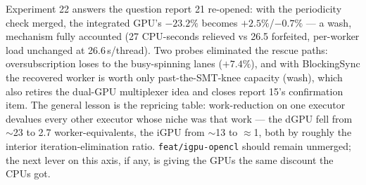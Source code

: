 \documentclass[
	english,
	letterpaper, oneside
]{article}
\begin{document}
Experiment 22 answers the question report 21 re-opened: with the periodicity
check merged, the integrated GPU's $-23.2\%$ becomes $+2.5\%$/$-0.7\%$ --- a
wash, mechanism fully accounted (27 CPU-seconds relieved vs 26.5 forfeited,
per-worker load unchanged at 26.6\,s/thread). Two probes eliminated the
rescue paths: oversubscription loses to the busy-spinning lanes ($+7.4\%$),
and with BlockingSync the recovered worker is worth only past-the-SMT-knee
capacity (wash), which also retires the dual-GPU multiplexer idea and closes
report 15's confirmation item. The general lesson is the repricing table:
work-reduction on one executor devalues every other executor whose niche was
that work --- the dGPU fell from $\sim$23 to 2.7 worker-equivalents, the
iGPU from $\sim$13 to $\approx$1, both by roughly the interior
iteration-elimination ratio. \texttt{feat/igpu-opencl} should remain
unmerged; the next lever on this axis, if any, is giving the GPUs the same
discount the CPUs got.
\end{document}
